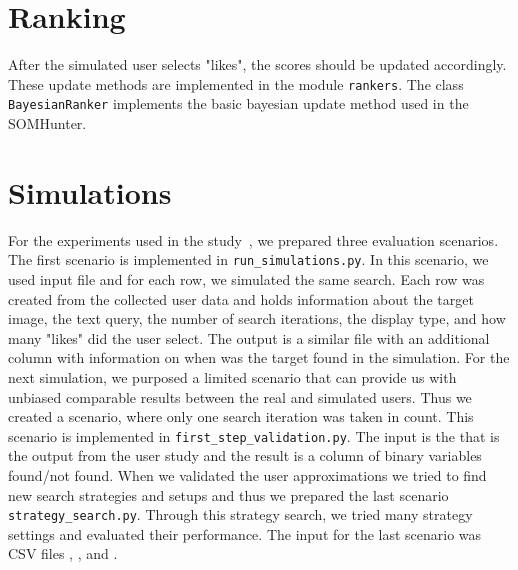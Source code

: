 \section{Ranking}

After the simulated user selects "likes", the scores should be updated accordingly. These update methods are implemented in the module \lstinline{rankers}. The class \lstinline{BayesianRanker} implements the basic bayesian update method used in the SOMHunter.

\section{Simulations}

For the experiments used in the study~\cite{peska2021}, we prepared three evaluation scenarios. The first scenario is implemented in \lstinline{run_simulations.py}. In this scenario, we used input file  and for each row, we simulated the same search. Each row was created from the collected user data and holds information about the target image, the text query,  the number of search iterations, the display type, and how many "likes" did the user select. The output is a similar file with an additional column with information on when was the target found in the simulation. For the next simulation, we purposed a limited scenario that can provide us with unbiased comparable results between the real and simulated users. Thus we created a scenario, where only one search iteration was taken in count. This scenario is implemented in \lstinline{first_step_validation.py}. The input is the  that is the output from the user study and the result is a column of binary variables found/not found. When we validated the user approximations we tried to find new search strategies and setups and thus we prepared the last scenario \lstinline{strategy_search.py}. Through this strategy search, we tried many strategy settings and evaluated their performance. The input for the last scenario was CSV files , , and .


